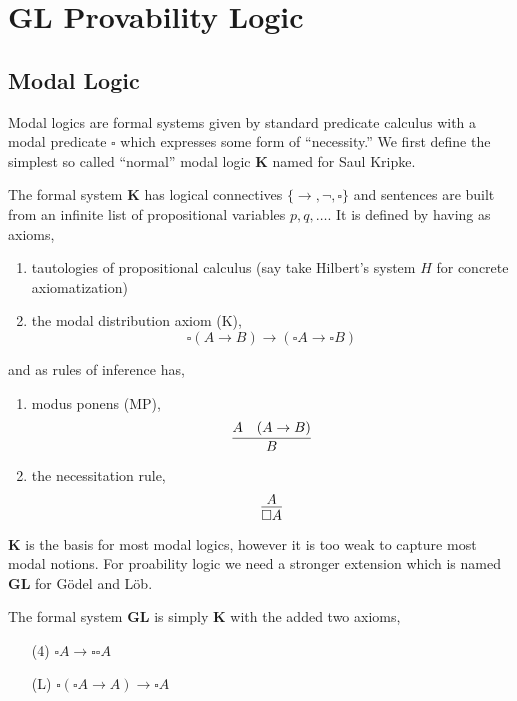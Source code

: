 \documentclass[12pt]{article}
\begin{document}
\section{GL Provability Logic}

\newcommand{\K}{\mathbf{K}}
\newcommand{\GL}{\mathbf{GL}}
\newcommand{\PA}{\mathbf{PA}}

\subsection{Modal Logic}

Modal logics are formal systems given by standard predicate calculus with a modal predicate $\square$ which expresses some form of ``necessity.'' We first define the simplest so called ``normal'' modal logic $\K$ named for Saul Kripke.

\begin{definition}
The formal system $\K$ has logical connectives $\{ \to, \neg, \square \}$ and sentences are built from an infinite list of propositional variables $p, q, \dots$. It is defined by having as axioms,
\begin{enumerate}
\item tautologies of propositional calculus (say take Hilbert's system $H$ for concrete axiomatization) 
\item the modal distribution axiom (K),
\[ \square (A \to B) \to (\square A \to \square B) \]
\end{enumerate}
and as rules of inference has,
\begin{enumerate}
\item modus ponens (MP),
\[ \infer{B}{A & (A \rightarrow B)} \]
\item the necessitation rule,
\[ \infer{\square A}{A} \]
\end{enumerate}
\end{definition}

\begin{remark}
$\K$ is the basis for most modal logics, however it is too weak to capture most modal notions. For proability logic we need a stronger extension which is named $\GL$ for G\"{o}del and L\"{o}b.
\end{remark}

\begin{definition}
The formal system $\GL$ is simply $\K$ with the added two axioms,
\begin{enumerate}
\item[(4)] $\square A \to \square \square A$
\item[(L)] $\square (\square A \to A) \to \square A$  
\end{enumerate}
\end{definition}
\end{document}
